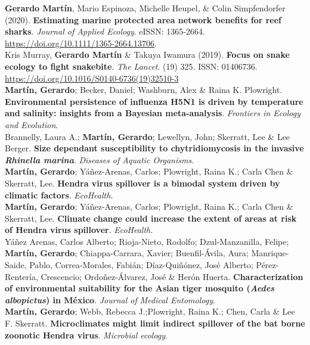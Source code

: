 \documentclass[12pt, a4paper]{article}
\newcommand{\years}[1]{\marginnote{\scriptsize #1}}
\begin{document}
\years{2020} \textbf{Gerardo Mart\'in}, Mario Espinoza, Michelle Heupel, \& Colin Simpfendorfer (2020). \textbf{Estimating marine protected area network benefits for reef sharks}. \emph{Journal of Applied Ecology}. eISSN: 1365-2664. \url{https://doi.org/10.1111/1365-2664.13706}.\\

\years{2019} Kris Murray, \textbf{Gerardo Mart\'in} \& Takuya Iwamura (2019). \textbf{Focus on snake ecology to fight snakebite}. \emph{The Lancet}. (19) 325. ISSN: 01406736. \url{https://doi.org/10.1016/S0140-6736(19)32510-3}\\

\years{2018} \textbf{Mart\'in, Gerardo}; Becker, Daniel; Washburn, Alex \& Raina K. Plowright. \textbf{Environmental persistence of influenza H5N1 is driven by temperature and salinity: insights from a Bayesian meta-analysis}. \emph{Frontiers in Ecology and Evolution}.\\

\years{2018} Brannelly, Laura A.; \textbf{Mart\'in, Gerardo}; Lewellyn, John; Skerratt, Lee \& Lee Berger. \textbf{Size dependant susceptibility to chytridiomycosis in the invasive \emph{Rhinella marina}}. \emph{Diseases of Aquatic Organisms}.\\

\years{2018} \textbf{Mart\'in, Gerardo}; Y\'a\~nez-Arenas, Carlos; Plowright, Raina K.; Carla Chen \& Skerratt, Lee. \textbf{Hendra virus spillover is a bimodal system driven by climatic factors}. \emph{EcoHealth}.\\

\years{2018} \textbf{Mart\'in, Gerardo}; Y\'a\~nez-Arenas, Carlos; Plowright, Raina K.; Carla Chen \& Skerratt, Lee. \textbf{Climate change could increase the extent of areas at risk of Hendra virus spillover}. \emph{EcoHealth}.\\

\years{2017} Y\'a\~nez Arenas, Carlos Alberto; Rioja-Nieto, Rodolfo; Dzul-Manzanilla, Felipe; \textbf{Mart\'in, Gerardo}; Chiappa-Carrara, Xavier; Buenfil-\'Avila, Aura; Manrique-Saide, Pablo, Correa-Morales, Fabi\'an; D\'iaz-Qui\~n\'onez, Jos\'e Alberto; P\'erez-Renter\'ia, Crescencio; Ordo\~nez-\'Alvarez, Jos\'e \& Her\'on Huerta. \textbf{Characterization of environmental suitability for the Asian tiger mosquito (\emph{Aedes albopictus}) in M\'exico}. \emph{Journal of Medical Entomology}.\\

\years{2017} \textbf{Mart\'in, Gerardo}; Webb, Rebecca J.;Plowright, Raina K.; Chen, Carla  \& Lee F. Skerratt. \textbf{Microclimates might limit indirect spillover of the bat borne zoonotic Hendra virus}. \emph{Microbial ecology}.\\
\end{document}
